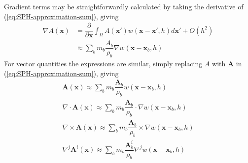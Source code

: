\documentclass[10pt,a4paper]{article}
\begin{document}
Gradient terms may be straightforwardly calculated by taking the derivative of (\ref{eq:SPH-approximation-sum}), giving
\begin{equation}
\begin{split}
\nabla A(\textbf{x}) & = \dfrac{\partial }{\partial \textbf{x}} \int_{\Omega} A(\textbf{x} \prime) w(\textbf{x}-\textbf{x}\prime, h) d\textbf{x}\prime + O(h^2) \\
& \approx \sum_b m_b \dfrac{A_b}{\rho_b} \nabla w(\textbf{x} - \textbf{x}_b, h)
\end{split} 
\label{eq:SPH-scalar-function-gradient}
\end{equation}
For vector quantities the expressions are similar, simply replacing $A$ with $\textbf{A}$ in (\ref{eq:SPH-approximation-sum}), giving
\begin{eqnarray}
\textbf{A}(\textbf{x}) \approx \sum_b m_b \dfrac{\textbf{A}_b}{\rho_b} w(\textbf{x}-\textbf{x}_b, h) \\
\nabla \cdot \textbf{A}(\textbf{x}) \approx \sum_b m_b \dfrac{\textbf{A}_b}{\rho_b} \cdot \nabla w(\textbf{x} - \textbf{x}_b, h) \\
\nabla \times \textbf{A}(\textbf{x}) \approx \sum_b m_b \dfrac{\textbf{A}_b}{\rho_b} \times \nabla w(\textbf{x} - \textbf{x}_b, h) \\
\nabla^j \textbf{A}^i(\textbf{x}) \approx \sum_b m_b \dfrac{\textbf{A}_b^i}{\rho_b} \nabla^j w(\textbf{x} - \textbf{x}_b, h) \label{eq:SPH-vecctor-function}
\end{eqnarray}
\end{document}
